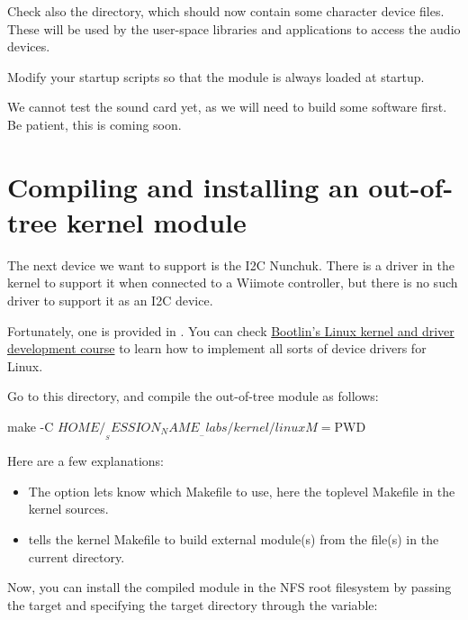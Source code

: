 {Check also the  directory, which should now contain
some character device files. These will be used by the user-space
libraries and applications to access the audio devices.

Modify your startup scripts so that the  module
is always loaded at startup.

We cannot test the sound card yet, as we will need to build some
software first. Be patient, this is coming soon.

\section{Compiling and installing an out-of-tree kernel module}

The next device we want to support is the I2C Nunchuk. There is a driver
in the kernel to support it when connected to a Wiimote controller, but
there is no such driver to support it as an I2C device.

Fortunately, one is provided in
. You can check
\href{https://bootlin.com/training/kernel/}{Bootlin's Linux kernel and
driver development course} to learn how to implement all sorts of device
drivers for Linux.

Go to this directory, and compile the out-of-tree module as follows:

\begin{bashinput}
make -C $HOME/__SESSION_NAME__-labs/kernel/linux M=$PWD
\end{bashinput}

Here are a few explanations:
\begin{itemize}
\item The  option lets  know which Makefile to
      use, here the toplevel Makefile in the kernel sources.
\item {} tells the kernel Makefile to build external
      module(s) from the file(s) in the current directory.
\end{itemize}

Now, you can install the compiled module in the NFS root filesystem
by passing the  target and specifying the
target directory through the  variable:


}
